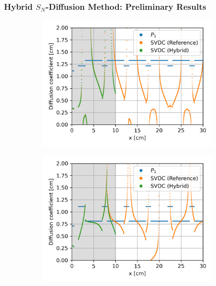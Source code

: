 \begin{frame}
  \frametitle{Hybrid $S_N$-Diffusion Method: Preliminary Results}
  \begin{figure}
    \centering
    \begin{subfigure}[t]{.35\textwidth}
      \centering
      \includegraphics[width=\textwidth]{images/case-5a-group-1-diffcoef}
      \label{fig:c5ag1dc}
    \end{subfigure}
    \begin{subfigure}[t]{.35\textwidth}
      \centering
      \includegraphics[width=\textwidth]{images/case-5a-group-2-diffcoef}
      \label{fig:c5ag2dc}
    \end{subfigure}
    \begin{subfigure}[t]{.35\textwidth}

\end{subfigure}
\end{figure}
\end{frame}
